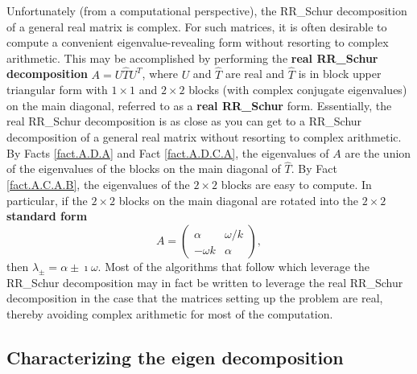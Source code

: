 Unfortunately (from a computational perspective), the RR_Schur decomposition of a general real matrix is complex.
For such matrices, it is often desirable to compute a convenient eigenvalue-revealing form without resorting to
complex arithmetic.  This may be accomplished by performing the {\bf real RR_Schur decomposition} $A=U \hat T U^T$, 
where $U$ and $\hat T$ are real and $\hat T$ is in block upper triangular form with $1\times 1$ and $2\times 2$
blocks (with complex conjugate eigenvalues) on the main diagonal, referred to as a {\bf real RR_Schur} form.  
Essentially, the real RR_Schur decomposition is as close as you can get to a RR_Schur decomposition of a
general real matrix without resorting to complex arithmetic.
By Facts \ref{fact.A.D.A} and Fact \ref{fact.A.D.C.A}, the eigenvalues of $A$ are the
union of the eigenvalues of the blocks on the main diagonal of $\hat T$.  By Fact \ref{fact.A.C.A.B}, the eigenvalues of
the $2\times 2$ blocks are easy to compute.
In particular, if the $2\times 2$ blocks on the main diagonal are rotated into the {\bf $2\times 2$ standard form}
\begin{equation}
A=\begin{pmatrix} \alpha & \omega/k \\ -\omega k & \alpha \end{pmatrix},
\label{2by2standardform}
\end{equation}
then $\lambda_{\pm}=\alpha\pm \imath \omega$.  Most of the algorithms that follow which leverage the RR_Schur decomposition may
in fact be written to leverage the real RR_Schur decomposition in the case that the matrices setting up the problem are real, thereby
avoiding complex arithmetic for most of the computation.

\subsection{Characterizing the eigen decomposition}\label{sec.A.D.D}

